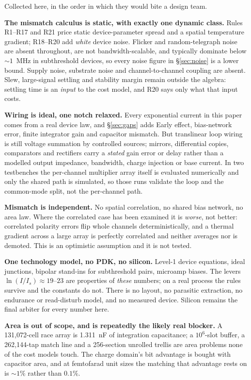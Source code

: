 \documentclass[11pt]{article}
\begin{document}
Collected here, in the order in which they would bite a design team.

\textbf{The mismatch calculus is static, with exactly one dynamic class.} Rules R1--R17 and R21 price static device-parameter spread and a spatial temperature gradient; R18--R20 add \textit{white} device noise. Flicker and random-telegraph noise are absent throughout, are not bandwidth-scalable, and typically dominate below ${\sim}1$~MHz in subthreshold devices, so every noise figure in \S\ref{sec:noise} is a lower bound. Supply noise, substrate noise and channel-to-channel coupling are absent. Slew, large-signal settling and stability margin remain outside the algebra: settling time is an \textit{input} to the cost model, and R20 says only what that input costs.

\textbf{Wiring is ideal, one notch relaxed.} Every exponential current in this paper comes from a real device law, and \S\ref{sec:gaps} adds Early effect, bias-network error, finite integrator gain and capacitor mismatch. But translinear loop wiring is still voltage summation by controlled sources; mirrors, differential copies, comparators and rectifiers carry a \textit{stated} gain error or delay rather than a modelled output impedance, bandwidth, charge injection or base current. In two testbenches the per-channel multiplier array itself is evaluated numerically and only the shared path is simulated, so those runs validate the loop and the common-mode split, not the per-channel path.

\textbf{Mismatch is independent.} No spatial correlation, no shared bias network, no area law. Where the correlated case has been examined it is \textit{worse}, not better: correlated polarity errors flip whole channels deterministically, and a thermal gradient across a large array is perfectly correlated and neither averages nor is demoted. This is an optimistic assumption and it is not tested.

\textbf{One technology model, no PDK, no silicon.} Level-1 device equations, ideal junctions, bipolar stand-ins for subthreshold pairs, microamp biases. The levers $\ln(I/I_s) \approx 19$--$23$ are properties of \textit{these} numbers; on a real process the rules survive and the constants do not. There is no layout, no parasitic extraction, no endurance or read-disturb model, and no measured device. Silicon remains the final arbiter for every number here.

\textbf{Area is out of scope, and is repeatedly the likely real blocker.} A 131{,}072-cell race array is 1.311~nF of integration capacitance; a $10^6$-slot buffer, a 262{,}144-tap match line and a 256-section unrolled trellis are area problems none of the cost models touch. The charge domain's bit advantage is bought with capacitor area, and at femtofarad unit sizes the matching that advantage rests on is ${\sim}1\%$ rather than $0.1\%$.
\end{document}
